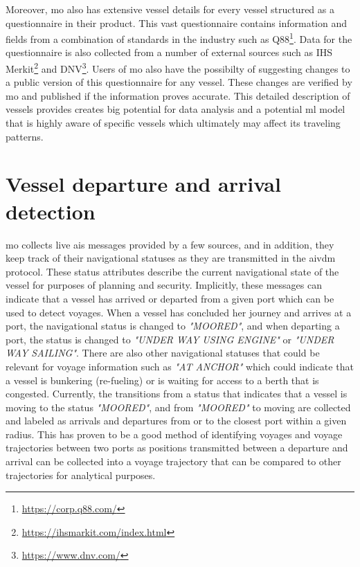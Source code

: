 Moreover, \acrshort{mo} also has extensive vessel details for every vessel structured as a questionnaire in their product. This vast questionnaire contains information and fields from a combination of standards in the industry such as Q88\footnote{\url{https://corp.q88.com/}}. Data for the questionnaire is also collected from a number of external sources such as IHS Merkit\footnote{\url{https://ihsmarkit.com/index.html}} and DNV\footnote{\url{https://www.dnv.com/}}. Users of \acrshort{mo} also have the possibilty of suggesting changes to a public version of this questionnaire for any vessel. These changes are verified by \acrshort{mo} and published if the information proves accurate. This detailed description of vessels provides creates big potential for data analysis and a potential \acrshort{ml} model that is highly aware of specific vessels which ultimately may affect its traveling patterns.

\section{Vessel departure and arrival detection}

\acrshort{mo} collects live \acrshort{ais} messages provided by a few sources, and in addition, they keep track of their navigational statuses as they are transmitted in the \gls{aivdm} protocol. These status attributes describe the current navigational state of the vessel for purposes of planning and security. Implicitly, these messages can indicate that a vessel has arrived or departed from a given port which can be used to detect voyages. When a vessel has concluded her journey and arrives at a port, the navigational status is changed to \textit{"MOORED"}, and when departing a port, the status is changed to \textit{"UNDER WAY USING ENGINE"} or \textit{"UNDER WAY SAILING"}. There are also other navigational statuses that could be relevant for voyage information such as \textit{"AT ANCHOR"} which could indicate that a vessel is bunkering (re-fueling) or is waiting for access to a berth that is congested. Currently, the transitions from a status that indicates that a vessel is moving to the status \textit{"MOORED"}, and from \textit{"MOORED"} to moving are collected and labeled as arrivals and departures from or to the closest port within a given radius. This has proven to be a good method of identifying voyages and voyage trajectories between two ports as positions transmitted between a departure and arrival can be collected into a voyage trajectory that can be compared to other trajectories for analytical purposes.


